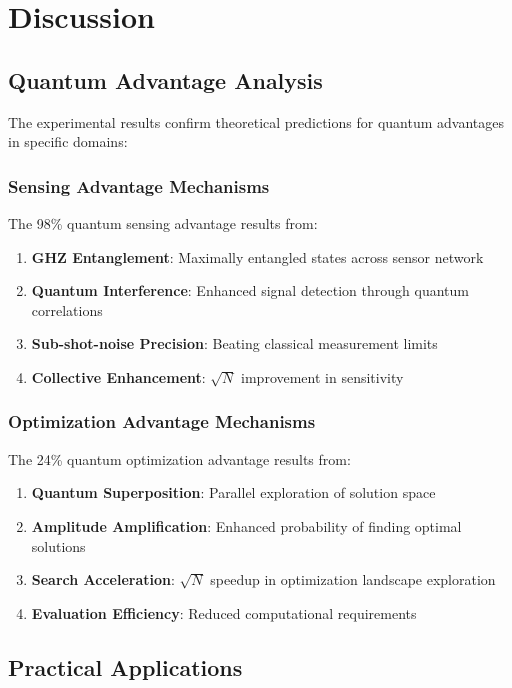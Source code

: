 \documentclass[12pt,a4paper]{report}
\begin{document}
\chapter{Discussion}

\section{Quantum Advantage Analysis}

The experimental results confirm theoretical predictions for quantum advantages in specific domains:

\subsection{Sensing Advantage Mechanisms}

The 98\% quantum sensing advantage results from:

\begin{enumerate}
\item \textbf{GHZ Entanglement}: Maximally entangled states across sensor network
\item \textbf{Quantum Interference}: Enhanced signal detection through quantum correlations
\item \textbf{Sub-shot-noise Precision}: Beating classical measurement limits
\item \textbf{Collective Enhancement}: $\sqrt{N}$ improvement in sensitivity
\end{enumerate}

\subsection{Optimization Advantage Mechanisms}

The 24\% quantum optimization advantage results from:

\begin{enumerate}
\item \textbf{Quantum Superposition}: Parallel exploration of solution space
\item \textbf{Amplitude Amplification}: Enhanced probability of finding optimal solutions
\item \textbf{Search Acceleration}: $\sqrt{N}$ speedup in optimization landscape exploration
\item \textbf{Evaluation Efficiency}: Reduced computational requirements
\end{enumerate}

\section{Practical Applications}
\end{document}
